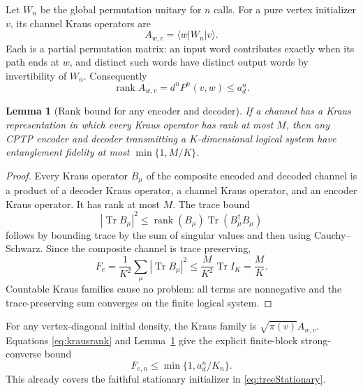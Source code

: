\documentclass[11pt]{article}
\newtheorem{lemma}[theorem]{Lemma}
\theoremstyle{definition}\newtheorem{definition}[theorem]{Definition}
\newcommand{\Tr}{\operatorname{Tr}}
\newcommand{\rank}{\operatorname{rank}}
\newcommand{\ket}[1]{\lvert #1\rangle}
\newcommand{\bra}[1]{\langle #1\rvert}
\begin{document}
Let $W_n$ be the global permutation unitary for $n$ calls. For a pure vertex initializer $v$, its channel Kraus operators are
\[
 A_{w,v}=\bra wW_n\ket v.
\]
Each is a partial permutation matrix: an input word contributes exactly when its path ends at $w$, and distinct such words have distinct output words by invertibility of $W_n$. Consequently
\begin{equation}
 \rank A_{w,v}=d^nP^n(v,w)\le a_d^n.\label{eq:krausrank}
\end{equation}

\begin{lemma}[Rank bound for any encoder and decoder]\label{lem:rankfidelity}
If a channel has a Kraus representation in which every Kraus operator has rank at most $M$, then any CPTP encoder and decoder transmitting a $K$-dimensional logical system have entanglement fidelity at most $\min\{1,M/K\}$.
\end{lemma}
\begin{proof}
Every Kraus operator $B_\mu$ of the composite encoded and decoded channel is a product of a decoder Kraus operator, a channel Kraus operator, and an encoder Kraus operator. It has rank at most $M$. The trace bound
\[
 |\Tr B_\mu|^2\le\rank(B_\mu)\Tr(B_\mu^\dagger B_\mu)
\]
follows by bounding trace by the sum of singular values and then using Cauchy--Schwarz. Since the composite channel is trace preserving,
\[
 F_e=\frac1{K^2}\sum_\mu|\Tr B_\mu|^2
 \le\frac M{K^2}\Tr I_K=\frac MK.
\]
Countable Kraus families cause no problem: all terms are nonnegative and the trace-preserving sum converges on the finite logical system.
\end{proof}

For any vertex-diagonal initial density, the Kraus family is $\sqrt{\pi(v)}A_{w,v}$. Equations \eqref{eq:krausrank} and Lemma~\ref{lem:rankfidelity} give the explicit finite-block strong-converse bound
\begin{equation}
 F_{e,n}\le\min\{1,a_d^n/K_n\}.\label{eq:diagconverse}
\end{equation}
This already covers the faithful stationary initializer in \eqref{eq:treeStationary}.
\end{document}
